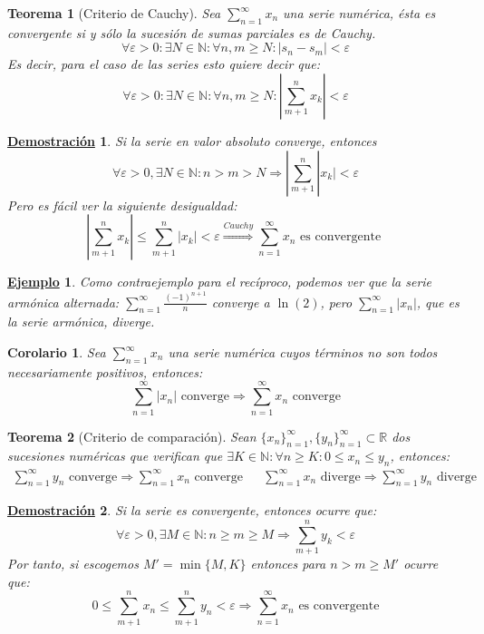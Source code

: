 \documentclass[10pt,a4paper,openright]{book}
\theoremstyle{break}
\newtheorem{theo}{Teorema}[chapter]
\newtheorem{coro}{Corolario}[theo]
\newtheorem*{demo}{\underline{Demostración}}
\newtheorem{ej}{\underline{Ejemplo}}[chapter]
\begin{document}
\begin{theo}[Criterio de Cauchy]
Sea $\sum_{n=1}^{\infty} x_n$ una serie numérica, ésta es convergente si y sólo la sucesión de sumas parciales es de Cauchy.
$$\forall \varepsilon >0 : \exists N\in \mathbb N: \forall n,m\geq N: |s_n-s_m|<\varepsilon$$
Es decir, para el caso de las series esto quiere decir que:
$$\forall \varepsilon >0 : \exists N\in \mathbb N: \forall n,m\geq N: \left|\sum_{m+1}^{n} x_k\right|<\varepsilon$$
\end{theo}
\begin{demo}
Si la serie en valor absoluto converge, entonces
$$\forall \varepsilon > 0, \exists N \in \mathbb{N}: n > m > N \Rightarrow |\sum_{m+1}^{n} |x_k| < \varepsilon$$
Pero es fácil ver la siguiente desigualdad:
$$\left|\sum_{m+1}^{n} x_k\right| \leq \sum_{m+1}^{n} \left|x_k\right|  < \varepsilon \overset{Cauchy}{\Rightarrow} \sum_{n=1}^{\infty} x_n \mbox{ es convergente }$$
\end{demo}

\begin{ej}
Como contraejemplo para el recíproco, podemos ver que la serie armónica alternada: $\sum_{n=1}^{\infty} \frac{(-1)^{n+1}}{n}$ converge a $\ln(2)$, pero $\sum_{n=1}^{\infty} |x_n|$, que es la serie armónica, diverge.
\end{ej}

\begin{coro}
\label{coro:convergencia_abs-convergencia}
Sea $\sum_{n=1}^{\infty} x_n$ una serie numérica cuyos términos no son todos necesariamente positivos, entonces:
\[
\sum_{n=1}^{\infty} |x_n|\mbox{ converge}\Rightarrow \sum_{n=1}^{\infty} x_n\mbox{ converge}
\]
\end{coro}

\begin{theo}[Criterio de comparación]
Sean $\{x_n\}_{n=1}^\infty, \{y_n\}_{n=1}^\infty \subset \mathbb{R}$ dos sucesiones numéricas que verifican que $\exists K \in \mathbb{N}: \forall n \geq K : 0 \leq x_n \leq y_n$, entonces:
\begin{align*}
\sum_{n=1}^{\infty} y_n \mbox{ converge} \Rightarrow \sum_{n = 1}^{\infty} x_n \mbox{ converge} & & \sum_{n=1}^{\infty} x_n\mbox{ diverge}\Rightarrow \sum_{n = 1}^{\infty} y_n \mbox{ diverge}
\end{align*}
\end{theo}
\begin{demo}
Si la serie es convergente, entonces ocurre que:
$$\forall \varepsilon > 0, \exists M \in \mathbb{N}: n \geq m \geq M \Rightarrow \sum_{m+1}^{n} y_k	< \varepsilon$$
Por tanto, si escogemos $M'=\min\{M,K\}$ entonces para $n>m\geq M'$ ocurre que:
$$0 \leq \sum_{m+1}^{n} x_n \leq \sum_{m+1}^{n} y_n < \varepsilon \Rightarrow \sum_{n=1}^{\infty} x_n\mbox{ es convergente}$$
\end{demo}
\end{document}
